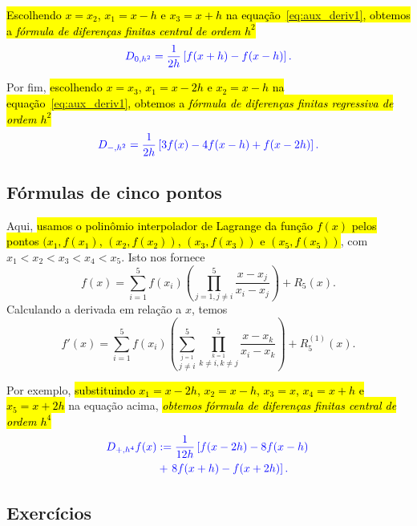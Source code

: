 \hl{Escolhendo $x=x_2$, $x_1=x-h$ e $x_3=x+h$ na equação~{\eqref{eq:aux_deriv1}}, obtemos a \emph{fórmula de diferenças finitas central de ordem $h^2$}}
\begin{equation}\color{blue}D_{0,h^2} = \frac{1}{2 h} \left[f{\left (x + h \right )} - f{\left (x - h \right )}\right].
\end{equation}

Por fim, \hl{escolhendo $x=x_3$, $x_1=x-2h$ e $x_2=x-h$ na equação~{\eqref{eq:aux_deriv1}}, obtemos a \emph{fórmula de diferenças finitas regressiva de ordem $h^2$}}
\begin{equation}\color{blue}D_{-,h^2} = \frac{1}{2 h} \left[3 f{\left (x \right )} - 4 f{\left (x - h \right )}  + f{\left (x - 2 h\right )}\right].
\end{equation}

\subsection{Fórmulas de cinco pontos}

Aqui, \hl{usamos o polinômio interpolador de Lagrange da função $f(x)$ pelos pontos $(x_1, f(x_1)$, $(x_2, f(x_2))$, $(x_3, f(x_3))$ e $(x_5, f(x_5))$}, com $x_1 < x_2 < x_3 < x_4 < x_5$. Isto nos fornece
\begin{equation}
  f(x) = \sum_{i=1}^5 f(x_i)\left(\prod_{j=1, j\neq i}^{5} \frac{x-x_j}{x_i-x_j}\right) + R_5(x).
\end{equation}
Calculando a derivada em relação a $x$, temos
\begin{equation}\label{eq:aux_deriv2}
  f'(x) = \sum_{i=1}^5 f(x_i)\left(\sum_{\overset{j=1}{j\neq i}}^5\prod_{\overset{k=1}{k\neq i, k\neq j}}^{5} \frac{x-x_k}{x_i-x_k}\right) + R^{(1)}_5(x).
\end{equation}

Por exemplo, \hl{substituindo $x_1=x-2h$, $x_2=x-h$, $x_3=x$, $x_4=x+h$ e $x_5=x+2h$} na equação acima, \hl{\emph{obtemos fórmula de diferenças finitas central de ordem $h^4$}}
\begin{equation}\label{eq:dfc_5pts}\color{blue}\begin{aligned}
    D_{+,h^4}f(x) &:= \frac{1}{12h} \left[f{\left (x - 2 h\right )} - 8 f{\left(x - h \right )} \right. \\
    &+ \left. 8 f{\left (x + h \right )} - f{\left (x + 2 h \right )}\right].
  \end{aligned}
\end{equation}

\subsection*{Exercícios}


